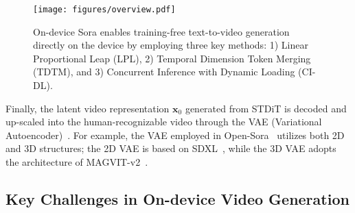 


\begin{figure*}[!t]
    \centering
    \texttt{[image: figures/overview.pdf]}
    \caption{On-device Sora enables training-free text-to-video generation directly on the device by employing three key methods: 1) Linear Proportional Leap (LPL), 2) Temporal Dimension Token Merging (TDTM), and 3) Concurrent Inference with Dynamic Loading (CI-DL).}
    \label{fig:overview}
\end{figure*}

Finally, the latent video representation $\mathbf{x}_0$ generated from STDiT is decoded and up-scaled into the human-recognizable video through the VAE (Variational Autoencoder)~\cite{doersch2016tutorial}. For example, the VAE employed in Open-Sora~\cite{opensora} utilizes both 2D and 3D structures; the 2D VAE is based on SDXL~\cite{podell2023sdxl}, while the 3D VAE adopts the architecture of MAGVIT-v2~\cite{yu2023language}. %

\subsection{Key Challenges in On-device Video Generation}
\label{sec:challenges}



